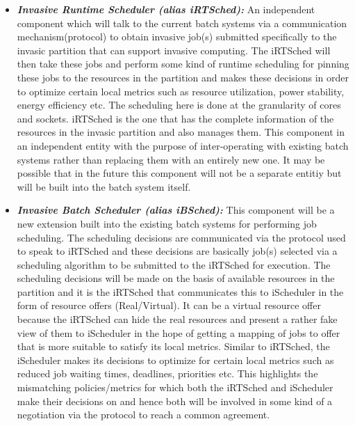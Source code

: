 \begin{itemize}
\item \textbf{\textit{Invasive Runtime Scheduler (alias iRTSched):}} An independent component which will talk to the current batch systems via a communication mechanism(protocol) to obtain invasive job(s) submitted specifically to the invasic partition that can support invasive computing. The iRTSched will then take these jobs and perform some kind of runtime scheduling for pinning these jobs to the resources in the partition and makes these decisions in order to optimize certain local metrics such as resource utilization, power stability, energy efficiency etc. The scheduling here is done at the granularity of cores and sockets. iRTSched is the one that has the complete information of the resources in the invasic partition and also manages them. This component in an independent entity with the purpose of inter-operating with existing batch systems rather than replacing them with an entirely new one. It may be possible that in the future this component will not be a separate entitiy but will be built into the batch system itself.
\item \textbf{\textit{Invasive Batch Scheduler (alias iBSched):}} This component will be a new extension built into the existing batch systems for performing job scheduling. The scheduling decisions are communicated via the protocol used to speak to iRTSched and these decisions are basically job(s) selected via a scheduling algorithm to be submitted to the iRTSched for execution. The scheduling decisions will be made on the basis of available resources in the partition and it is the iRTSched that communicates this to iScheduler in the form of resource offers (Real/Virtual). It can be a virtual resource offer because the iRTSched can hide the real resources and present a rather fake view of them to iScheduler in the hope of getting a mapping of jobs to offer that is more suitable to satisfy its local metrics. Similar to iRTSched, the iScheduler makes its decisions to optimize for certain local metrics such as reduced job waiting times, deadlines, priorities etc. This highlights the mismatching policies/metrics for which both the iRTSched and iScheduler make their decisions on and hence both will be involved in some kind of a negotiation via the protocol to reach a common agreement.

\end{itemize}
